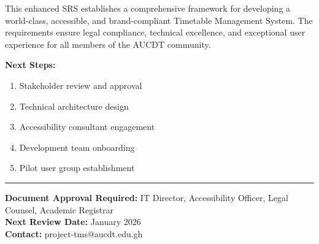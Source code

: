 \documentclass[11pt, a4paper]{article}
\begin{document}
This enhanced SRS establishes a comprehensive framework for developing a world-class, accessible, and brand-compliant Timetable Management System. The requirements ensure legal compliance, technical excellence, and exceptional user experience for all members of the AUCDT community.

\textbf{Next Steps:}
\begin{enumerate}
    \item Stakeholder review and approval
    \item Technical architecture design
    \item Accessibility consultant engagement
    \item Development team onboarding
    \item Pilot user group establishment
\end{enumerate}

\vfill
\hrule
\vspace{2mm}
\begin{center}
    \poppinslight
    \textbf{Document Approval Required:} IT Director, Accessibility Officer, Legal Counsel, Academic Registrar \\
    \textbf{Next Review Date:} January 2026 \\
    \textbf{Contact:} project-tms@aucdt.edu.gh
\end{center}
\end{document}
